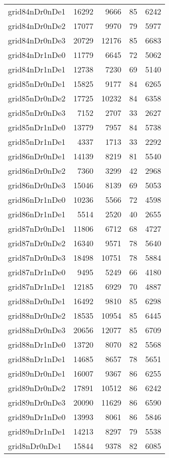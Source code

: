 \begin{longtable}{lrrrr}
grid84nDr0nDe1 & 16292 & 9666 & 85 & 6242 \\
grid84nDr0nDe2 & 17077 & 9970 & 79 & 5977 \\
grid84nDr0nDe3 & 20729 & 12176 & 85 & 6683 \\
grid84nDr1nDe0 & 11779 & 6645 & 72 & 5062 \\
grid84nDr1nDe1 & 12738 & 7230 & 69 & 5140 \\
grid85nDr0nDe1 & 15825 & 9177 & 84 & 6265 \\
grid85nDr0nDe2 & 17725 & 10232 & 84 & 6358 \\
grid85nDr0nDe3 & 7152 & 2707 & 33 & 2627 \\
grid85nDr1nDe0 & 13779 & 7957 & 84 & 5738 \\
grid85nDr1nDe1 & 4337 & 1713 & 33 & 2292 \\
grid86nDr0nDe1 & 14139 & 8219 & 81 & 5540 \\
grid86nDr0nDe2 & 7360 & 3299 & 42 & 2968 \\
grid86nDr0nDe3 & 15046 & 8139 & 69 & 5053 \\
grid86nDr1nDe0 & 10236 & 5566 & 72 & 4598 \\
grid86nDr1nDe1 & 5514 & 2520 & 40 & 2655 \\
grid87nDr0nDe1 & 11806 & 6712 & 68 & 4727 \\
grid87nDr0nDe2 & 16340 & 9571 & 78 & 5640 \\
grid87nDr0nDe3 & 18498 & 10751 & 78 & 5884 \\
grid87nDr1nDe0 & 9495 & 5249 & 66 & 4180 \\
grid87nDr1nDe1 & 12185 & 6929 & 70 & 4887 \\
grid88nDr0nDe1 & 16492 & 9810 & 85 & 6298 \\
grid88nDr0nDe2 & 18535 & 10954 & 85 & 6445 \\
grid88nDr0nDe3 & 20656 & 12077 & 85 & 6709 \\
grid88nDr1nDe0 & 13720 & 8070 & 82 & 5568 \\
grid88nDr1nDe1 & 14685 & 8657 & 78 & 5651 \\
grid89nDr0nDe1 & 16007 & 9367 & 86 & 6255 \\
grid89nDr0nDe2 & 17891 & 10512 & 86 & 6242 \\
grid89nDr0nDe3 & 20090 & 11629 & 86 & 6590 \\
grid89nDr1nDe0 & 13993 & 8061 & 86 & 5846 \\
grid89nDr1nDe1 & 14213 & 8297 & 79 & 5538 \\
grid8nDr0nDe1 & 15844 & 9378 & 82 & 6085 \\

\end{longtable}
